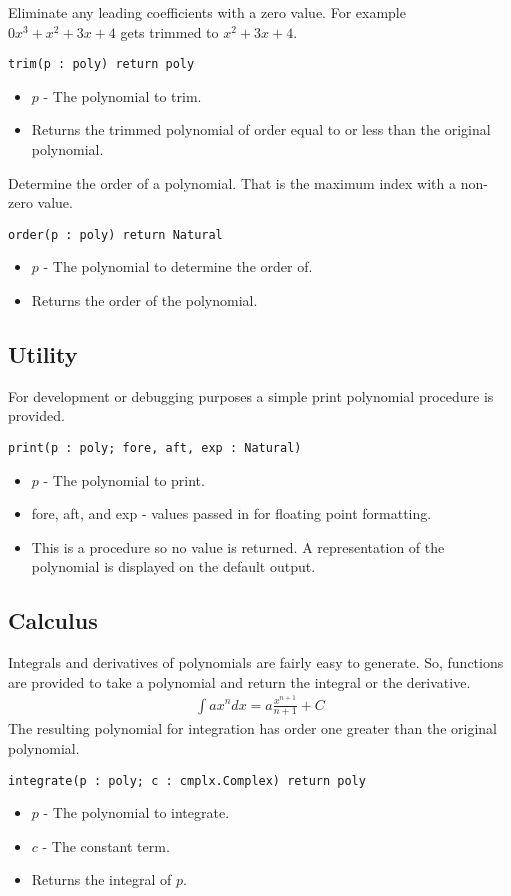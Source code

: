 \documentclass[10pt, openany]{book}
\newcommand{\function}[1]{\texttt{#1}}
\begin{document}
Eliminate any leading coefficients with a zero value.  For example $0x^3+x^2+3x+4$ gets trimmed to $x^2+3x+4$.

\function{trim(p : poly) return poly}
\begin{itemize}
  \item $p$ - The polynomial to trim.
  \item Returns the trimmed polynomial of order equal to or less than the original polynomial.
\end{itemize}

Determine the order of a polynomial.  That is the maximum index with a non-zero value.

\function{order(p : poly) return Natural}
\begin{itemize}
  \item $p$ - The polynomial to determine the order of.
  \item Returns the order of the polynomial.
\end{itemize}

\subsection{Utility}
For development or debugging purposes a simple print polynomial procedure is provided.

\function{print(p : poly; fore, aft, exp : Natural)}
\begin{itemize}
  \item $p$ - The polynomial to print.
  \item fore, aft, and exp - values passed in for floating point formatting.
  \item This is a procedure so no value is returned.  A representation of the polynomial is displayed on the default output.
\end{itemize}

\subsection{Calculus}
Integrals and derivatives of polynomials are fairly easy to generate.  So, functions are provided to take a polynomial and return the integral or the derivative.
\begin{align*}
  \int ax^n dx = a\frac{x^{n+1}}{n+1}+C
\end{align*}
The resulting polynomial for integration has order one greater than the original polynomial.

\function{integrate(p : poly; c : cmplx.Complex) return poly}
\begin{itemize}
  \item $p$ - The polynomial to integrate.
  \item $c$ - The constant term.
  \item Returns the integral of $p$.
\end{itemize}
\end{document}
